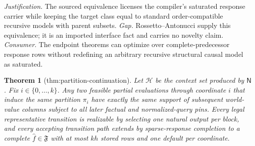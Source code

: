 \documentclass{article}
\newtheorem{theorem}{Theorem}
\begin{document}
\par\smallskip\noindent \textit{Justification.} The sourced equivalence licenses the compiler's saturated response carrier while keeping the target class equal to standard order-compatible recursive models with parent subsets. \textit{Gap.} Rossetto--Antonucci supply this equivalence; it is an imported interface fact and carries no novelty claim. \textit{Consumer.} The endpoint theorems can optimize over complete-predecessor response rows without redefining an arbitrary recursive structural causal model as saturated.

\begin{theorem}[thm:partition-continuation]\label{thm:partition-continuation}
Let \(\mathcal H\) be the context set produced by \(\mathsf N\). Fix \(i\in\{0,\ldots,k\}\). Any two feasible partial evaluations through coordinate \(i\) that induce the same partition \(\pi_i\) have exactly the same support of subsequent world-value columns subject to all later factual and normalized-query pins. Every legal representative transition is realizable by selecting one natural output per block, and every accepting transition path extends by sparse-response completion to a complete \(\widehat f\in\mathfrak F\) with at most \(kh\) stored rows and one default per coordinate.
\end{theorem}
\end{document}
